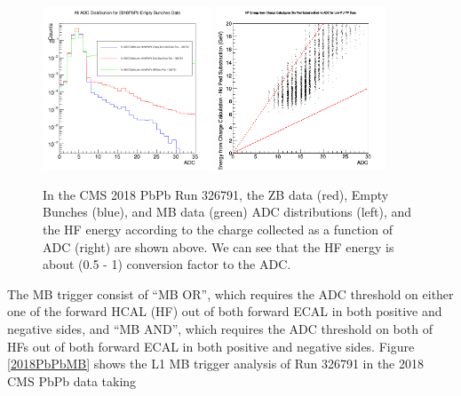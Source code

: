 \begin{figure}[hbtp]
\begin{center}
\includegraphics[width=0.45\textwidth]{Figures/Chapter3/AllADC.png}
\includegraphics[width=0.45\textwidth]{Figures/Chapter3/HFvsADC.png}
\caption{In the CMS 2018 PbPb Run 326791, the ZB data (red), Empty Bunches (blue), and MB data (green) ADC distributions (left), and the HF energy according to the charge collected as a function of ADC (right) are shown above. We can see that the HF energy  is about (0.5 - 1) conversion factor to the ADC.}
\label{HFADC}
\end{center}
\end{figure} 

The MB trigger consist of ``MB OR'', which requires the ADC threshold on either one of the forward HCAL (HF) out of both forward ECAL in both positive and negative sides, and ``MB AND'',  which requires the ADC threshold on both of HFs out of both forward ECAL in both positive and negative sides. Figure \ref{2018PbPbMB} shows the L1 MB trigger analysis of Run 326791 in the 2018 CMS PbPb data taking 

